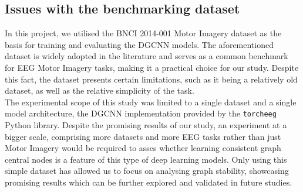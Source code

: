 \subsection{Issues with the benchmarking dataset}
In this project, we utilised the BNCI 2014-001 Motor Imagery dataset as the basis for training and evaluating the DGCNN models. The aforementioned dataset is widely adopted in the literature and serves as a common benchmark for EEG Motor Imagery tasks, making it a practical choice for our study. Despite this fact, the dataset presents certain limitations, such as it being a relatively old dataset, as well as the relative simplicity of the task.
\vspace{0.5em}\\
The experimental scope of this study was limited to a single dataset and a single model architecture, the DGCNN implementation provided by the \texttt{torcheeg} Python library. Despite the promising results of our study, an experiment at a bigger scale, comprising more datasets and more EEG tasks rather than just Motor Imagery would be required to asses whether learning consistent graph central nodes is a feature of this type of deep learning models. Only using this simple dataset has allowed us to focus on analysing graph stability, showcasing promising results which can be further explored and validated in future studies. 

